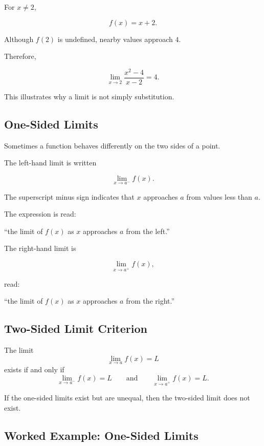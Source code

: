 For \(x\neq2\),

\[ f(x)=x+2. \]

Although \(f(2)\) is undefined, nearby values approach \(4\).

Therefore,

\[ \boxed{\lim_{x\to2}\frac{x^2-4}{x-2}=4.} \]

This illustrates why a limit is not simply substitution.

\subsection{One-Sided Limits}
\label{subsec:one-sided-limits}

Sometimes a function behaves differently on the two sides of a point.

The left-hand limit is written

\[ \lim_{x\to a^-}f(x). \]

The superscript minus sign indicates that \(x\) approaches \(a\) from values
less than \(a\).

The expression is read:

``the limit of \(f(x)\) as \(x\) approaches \(a\) from the left.''

The right-hand limit is

\[ \lim_{x\to a^+}f(x), \]

read:

``the limit of \(f(x)\) as \(x\) approaches \(a\) from the right.''

\subsection{Two-Sided Limit Criterion}
\label{subsec:two-sided-limit-criterion}

\begin{theorem}
The limit
\[ \lim_{x\to a}f(x)=L \]
exists if and only if
\[ \lim_{x\to a^-}f(x)=L
\qquad\text{and}\qquad
\lim_{x\to a^+}f(x)=L. \]
\end{theorem}

If the one-sided limits exist but are unequal, then the two-sided limit does
not exist.

\subsection{Worked Example: One-Sided Limits}
\label{subsec:worked-one-sided-limits}

